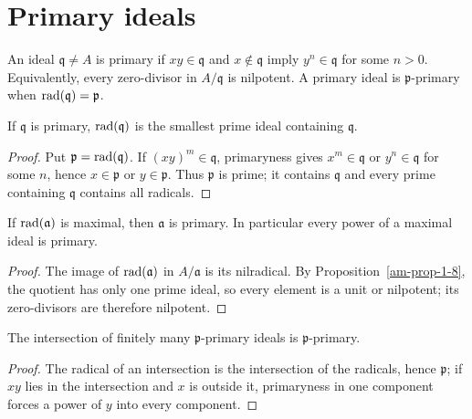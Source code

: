 \section{Primary ideals}
\label{am-ch4-primary}
\begin{definition}
\label{am-def-primary}
\uses{}
An ideal $\mathfrak{q}\ne A$ is primary if $xy\in\mathfrak{q}$ and $x\notin\mathfrak{q}$ imply
$y^n\in\mathfrak{q}$ for some $n>0$.  Equivalently, every zero-divisor in $A/\mathfrak{q}$ is
nilpotent.  A primary ideal is $\mathfrak{p}$-primary when $\operatorname{rad}(\mathfrak{q})=\mathfrak{p}$.
\end{definition}
\begin{proposition}
\label{am-prop-4-1}
\uses{}
If $\mathfrak{q}$ is primary, $\operatorname{rad}(\mathfrak{q})$ is the smallest prime ideal containing $\mathfrak{q}$.
\end{proposition}
\begin{proof}
Put $\mathfrak{p}=\operatorname{rad}(\mathfrak{q})$.  If $(xy)^m\in\mathfrak{q}$, primaryness gives $x^m\in\mathfrak{q}$ or
$y^n\in\mathfrak{q}$ for some $n$, hence $x\in\mathfrak{p}$ or $y\in\mathfrak{p}$.  Thus $\mathfrak{p}$ is prime;
it contains $\mathfrak{q}$ and every prime containing $\mathfrak{q}$ contains all radicals.
\end{proof}
\begin{proposition}
\label{am-prop-4-2}
\uses{}
If $\operatorname{rad}(\mathfrak{a})$ is maximal, then $\mathfrak{a}$ is primary.  In particular every
power of a maximal ideal is primary.
\end{proposition}
\begin{proof}
The image of $\operatorname{rad}(\mathfrak{a})$ in $A/\mathfrak{a}$ is its nilradical.  By
Proposition~\ref{am-prop-1-8}, the quotient has only one prime ideal, so every
element is a unit or nilpotent; its zero-divisors are therefore nilpotent.
\end{proof}
\begin{lemma}
\label{am-lem-4-3}
\uses{}
The intersection of finitely many $\mathfrak{p}$-primary ideals is $\mathfrak{p}$-primary.
\end{lemma}
\begin{proof}
The radical of an intersection is the intersection of the radicals, hence $\mathfrak{p}$;
if $xy$ lies in the intersection and $x$ is outside it, primaryness in one
component forces a power of $y$ into every component.
\end{proof}

